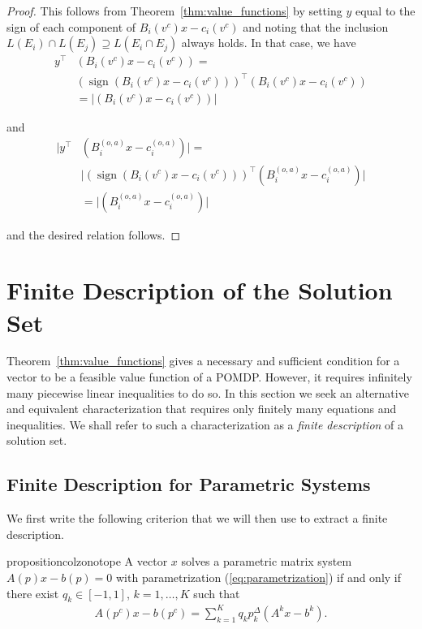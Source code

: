 \documentclass{article}
\theoremstyle{definition}
\theoremstyle{remark}
\begin{document}
\begin{proof}
This follows from Theorem~\ref{thm:value_functions} by setting $y$ equal to the sign of each component of $B_i(v^c)x - c_i(v^c)$ and noting that the inclusion $L(E_i)\cap L(E_j) \supseteq L(E_i\cap E_j)$ always holds. In that case, we have
\begin{align*}
    y^\top&(B_i(v^c)x - c_i(v^c)) = \\&(\operatorname{sign}(B_i(v^c)x - c_i(v^c)))^\top(B_i(v^c)x - c_i(v^c)) \\
    &= \vert (B_i(v^c)x - c_i(v^c)) \vert
\end{align*}

and 
\begin{align*}
    \vert y^\top&(B_i^{(o,a)}x - c_i^{(o,a)}) \vert= \\&
    \vert (\operatorname{sign}(B_i(v^c)x - c_i(v^c)))^\top(B_i^{(o,a)}x - c_i^{(o,a)}) \vert \\
    &= \vert (B_i^{(o,a)}x - c_i^{(o,a)}) \vert
\end{align*}

and the desired relation follows.
\end{proof}


\section{Finite Description of the Solution Set}
\label{sec:finite-solution-set}

Theorem~\ref{thm:value_functions} gives a necessary and sufficient condition for a vector to be a feasible value function of a POMDP. 
%
However, it requires infinitely many piecewise linear inequalities to do so. 
%
In this section we seek an alternative and equivalent characterization that requires only finitely many equations and inequalities. 
We shall refer to such a characterization as a \textit{finite description} of a solution set. 

\subsection{Finite Description for Parametric Systems}

We first write the following criterion that we will then use to extract a finite description.

\begin{restatable}{proposition}{colzonotope}
\label{col:zonotope-parametric}
A vector $x$ solves a parametric matrix system $A(p)x - b(p) = 0$ with parametrization (\ref{eq:parametrization}) if and only if there exist $q_k \in [-1,1]$, $k=1,\ldots, K$ such that 
\begin{align*}
    A(p^c)x - b(p^c) = \sum_{k=1}^K q_k p_k^\Delta (A^k x - b^k).
\end{align*}
\end{restatable} 
\end{document}
